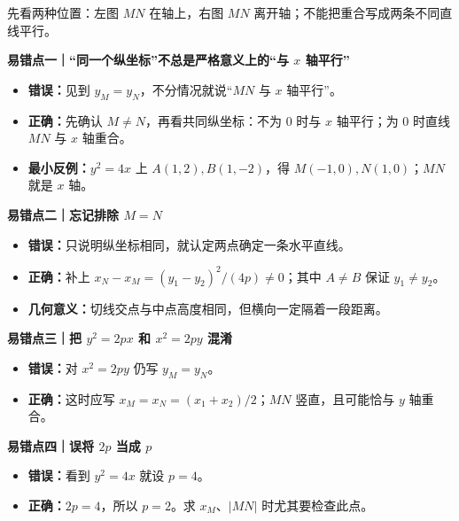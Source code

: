 \begin{trapbox}
\par\noindent\begin{minipage}{\linewidth}
\begin{center}


先看两种位置：左图 $MN$ 在轴上，右图 $MN$ 离开轴；不能把重合写成两条不同直线平行。
\end{center}
\end{minipage}\par
\textbf{\textcolor{CTrap}{易错点一｜“同一个纵坐标”不总是严格意义上的“与 $x$ 轴平行”}}
\begin{itemize}[leftmargin=*,itemsep=0.25em]
\item \textbf{错误：}见到 $y_M=y_N$，不分情况就说“$MN$ 与 $x$ 轴平行”。
\item \textbf{正确：}先确认 $M\ne N$，再看共同纵坐标：不为 $0$ 时与 $x$ 轴平行；为 $0$ 时直线 $MN$ 与 $x$ 轴重合。
\item \textbf{最小反例：}$y^2=4x$ 上 $A(1,2),B(1,-2)$，得 $M(-1,0),N(1,0)$；$MN$ 就是 $x$ 轴。
\end{itemize}

\medskip
\textbf{\textcolor{CTrap}{易错点二｜忘记排除 $M=N$}}
\begin{itemize}[leftmargin=*,itemsep=0.25em]
\item \textbf{错误：}只说明纵坐标相同，就认定两点确定一条水平直线。
\item \textbf{正确：}补上 $x_N-x_M=(y_1-y_2)^2/(4p)\ne0$；其中 $A\ne B$ 保证 $y_1\ne y_2$。
\item \textbf{几何意义：}切线交点与中点高度相同，但横向一定隔着一段距离。
\end{itemize}

\medskip
\pagebreak
\textbf{\textcolor{CTrap}{易错点三｜把 $y^2=2px$ 和 $x^2=2py$ 混淆}}
\begin{itemize}[leftmargin=*,itemsep=0.25em]
\item \textbf{错误：}对 $x^2=2py$ 仍写 $y_M=y_N$。
\item \textbf{正确：}这时应写 $x_M=x_N=(x_1+x_2)/2$；$MN$ 竖直，且可能恰与 $y$ 轴重合。
\end{itemize}

\medskip
\textbf{\textcolor{CTrap}{易错点四｜误将 $2p$ 当成 $p$}}
\begin{itemize}[leftmargin=*,itemsep=0.25em]
\item \textbf{错误：}看到 $y^2=4x$ 就设 $p=4$。
\item \textbf{正确：}$2p=4$，所以 $p=2$。求 $x_M$、$|MN|$ 时尤其要检查此点。
\end{itemize}


\end{trapbox}
